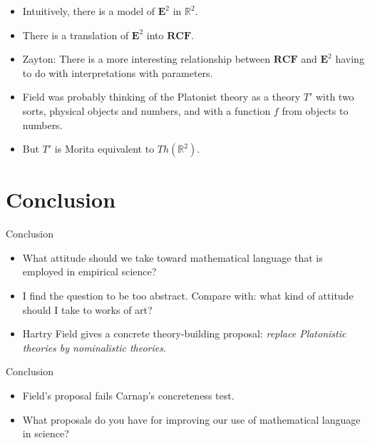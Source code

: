 \documentclass{beamer}
\begin{document}
\begin{frame}

  \begin{itemize}
  \item Intuitively, there is a model of $\mathbf{E}^2$ in
    $\mathbb{R}^2$.
  \item There is a translation of $\mathbf{E}^2$ into $\mathbf{RCF}$.
  \item Zayton: There is a more interesting relationship between
    $\mathbf{RCF}$ and $\mathbf{E}^2$ having to do with
    interpretations with parameters.
  \end{itemize}

\end{frame}

\begin{frame}

  \begin{itemize}
  \item Field was probably thinking of the Platonist theory as a
    theory $T'$ with two sorts, physical objects and numbers, and with
    a function $f$ from objects to numbers.
  \item But $T'$ is Morita equivalent to $Th(\mathbb{R}^2)$.
   \end{itemize}    

 \end{frame}

 \section{Conclusion}

\begin{frame}{Conclusion}

  \begin{itemize}
  \item What attitude should we take toward mathematical language that
    is employed in empirical science?
  \item I find the question to be too abstract. Compare with: what
    kind of attitude should I take to works of art?
  \item Hartry Field gives a concrete theory-building proposal:
    \textit{replace Platonistic theories by nominalistic theories}.
  \end{itemize}

\end{frame}

\begin{frame}{Conclusion}

  \begin{itemize}
  \item Field's proposal fails Carnap's concreteness test.
  \item What proposals do you have for improving our use of
    mathematical language in science? 
  \end{itemize}
    

\end{frame}  


 
\end{document}
